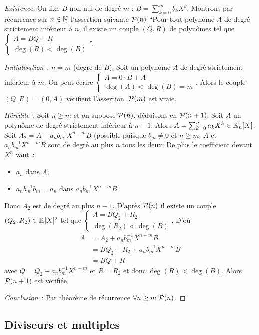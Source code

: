 \begin{proof}[Existence]
  On fixe $B$ non nul de degré $m$ : $B = \sum_{k=0}^m b_k X^k$. Montrons par récurrence sur $n \in \N$ l'assertion suivante $\P(n)$ ``Pour tout polynôme $A$ de degré strictement inférieur à $n$, il existe un couple $(Q,R)$ de polynômes tel que $\begin{cases} A=BQ+R \\ \deg(R) < \deg(B)\end{cases}$''.

  \emph{Initialisation}~: $n=m$ (degré de $B$). Soit un polynôme $A$ de degré strictement inférieur à $m$. On peut écrire $\begin{cases} A=0 \cdot B+A \\ \deg(A) < \deg(B)=m\end{cases}$. Alors le couple $(Q,R)=(0,A)$ vérifient l'assertion. $\P(m)$ est vraie.

  \emph{Hérédité}~: Soit $n \geq m$ et on suppose $\P(n)$, déduisons en $\P(n+1)$. Soit $A$ un polynôme de degré strictement inférieur à $n+1$. Alors $A=\sum_{k=0}^n a_k X^k \in \K_n[X]$. Soit $A_2 = A-a_nb_m^{-1}X^{n-m}B$ (possible puisque $b_m \neq 0$ et $n \geq m$. $A$ et $a_nb_m^{-1}X^{n-m}B$ sont de degré au plus $n$ tous les deux. De plus le coefficient devant $X^n$ vaut~:
  \begin{itemize}
  \item $a_n$ dans $A$;
  \item $a_nb_m^{-1}b_m=a_n$ dans $a_nb_m^{-1}X^{n-m}B$.
  \end{itemize}
  Donc $A_2$ est de degré au plus $n-1$. D'après $\P(n)$ il existe un couple $(Q_2,R_2) \in \K[X]^2$ tel que $\begin{cases} A=BQ_2+R_2 \\ \deg(R_2) < \deg(B)\end{cases}$. D'où
  \begin{align}
    A&=A_2 + a_n b_m^{-1}X^{n-m}B\\
    &=BQ_2+R_2 +a_n b_m^{-1}X^{n-m}B\\
    &=BQ+R
  \end{align}
  avec $Q=Q_2+a_n b_m^{-1}X^{n-m}$ et $R=R_2$ et donc $\deg(R) < \deg(B)$. Alors $\P(n+1)$ est vérifiée.

  \emph{Conclusion}~: Par théorème de récurrence $\forall n \geq m \ \P(n)$.
\end{proof}

\subsection{Diviseurs et multiples}


